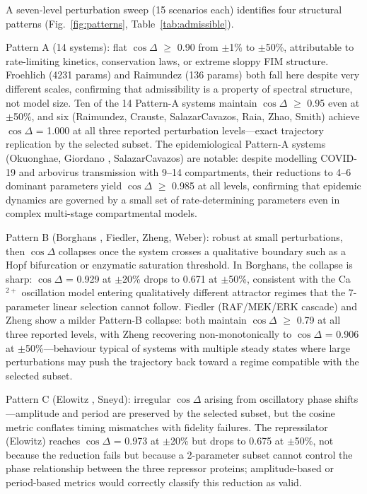 \documentclass[pdflatex,sn-nature]{sn-jnl}
\begin{document}
A seven-level perturbation sweep (15 scenarios each) identifies four structural patterns (Fig.~\ref{fig:patterns}, Table~\ref{tab:admissible}).


Pattern A (14 systems): flat $\cos\Delta$ $\ge$ 0.90 from $\pm$1\% to $\pm$50\%, attributable to rate-limiting kinetics, conservation laws, or extreme sloppy FIM structure. Froehlich \cite{bib12} (4231 params) and Raimundez (136 params) both fall here despite very different scales, confirming that admissibility is a property of spectral structure, not model size. Ten of the 14 Pattern-A systems maintain $\cos\Delta$ $\ge$ 0.95 even at $\pm$50\%, and six (Raimundez, Crauste, SalazarCavazos, Raia, Zhao, Smith) achieve $\cos\Delta$ = 1.000 at all three reported perturbation levels---exact trajectory replication by the selected subset. The epidemiological Pattern-A systems (Okuonghae, Giordano \cite{bib14}, SalazarCavazos) are notable: despite modelling COVID-19 and arbovirus transmission with 9--14 compartments, their reductions to 4--6 dominant parameters yield $\cos\Delta$ $\ge$ 0.985 at all levels, confirming that epidemic dynamics are governed by a small set of rate-determining parameters even in complex multi-stage compartmental models.


Pattern B (Borghans \cite{bib7}, Fiedler, Zheng, Weber): robust at small perturbations, then $\cos\Delta$ collapses once the system crosses a qualitative boundary such as a Hopf bifurcation or enzymatic saturation threshold. In Borghans, the collapse is sharp: $\cos\Delta$ = 0.929 at $\pm$20\% drops to 0.671 at $\pm$50\%, consistent with the Ca$^{2+}$ oscillation model entering qualitatively different attractor regimes that the 7-parameter linear selection cannot follow. Fiedler (RAF/MEK/ERK cascade) and Zheng show a milder Pattern-B collapse: both maintain $\cos\Delta$ $\ge$ 0.79 at all three reported levels, with Zheng recovering non-monotonically to $\cos\Delta$ = 0.906 at $\pm$50\%---behaviour typical of systems with multiple steady states where large perturbations may push the trajectory back toward a regime compatible with the selected subset.


Pattern C (Elowitz \cite{bib11}, Sneyd): irregular $\cos\Delta$ arising from oscillatory phase shifts---amplitude and period are preserved by the selected subset, but the cosine metric conflates timing mismatches with fidelity failures. The repressilator (Elowitz) reaches $\cos\Delta$ = 0.973 at $\pm$20\% but drops to 0.675 at $\pm$50\%, not because the reduction fails but because a 2-parameter subset cannot control the phase relationship between the three repressor proteins; amplitude-based or period-based metrics would correctly classify this reduction as valid.
\end{document}
